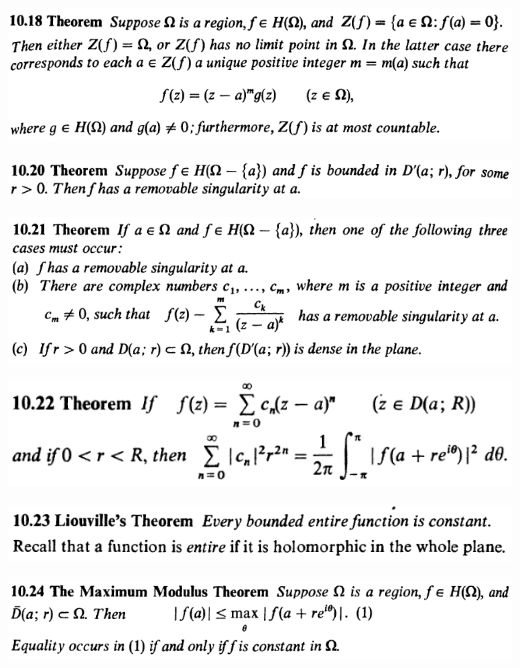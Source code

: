 \documentclass[12pt]{article}
\begin{document}
		\begin{center}
		\includegraphics{10ponto18}
		\end{center}

		\begin{center}
		\includegraphics{10ponto20}
		\end{center}

		\begin{center}
		\includegraphics{10ponto21}
		\end{center}

		\begin{center}
		\includegraphics{10ponto22}
		\end{center}

		\begin{center}
		\includegraphics{10ponto23}
		\end{center}

		\begin{center}
		\includegraphics{10ponto24}
		\end{center}
\end{document}
